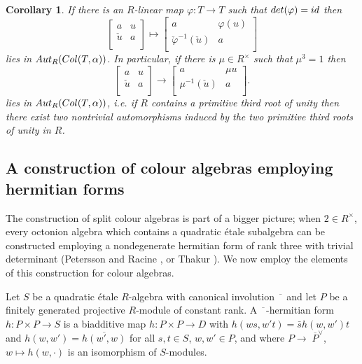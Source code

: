 \documentclass[10pt]{amsart}
\theoremstyle{plain}
\newtheorem{corollary}[theorem]{Corollary}
\theoremstyle{definition}
\newcommand{\can}{\overline{\phantom{x}}}
\begin{document}
\begin{corollary}
If there is an $R$-linear map $\varphi:T\to T$  such that ${\rm det}(\varphi)=id$
 then
\[
\left [\begin {array}{cc}
 a & u\\
\check{u}  &  a \\
\end {array}\right ]\mapsto
\left [\begin {array}{cc}
 a & \varphi(u)\\
\check{\varphi}^{-1}(\check{u})  &  a \\
\end {array}\right ]
\]
lies in ${\rm Aut}_R({\rm Col}( T,\alpha))$.
 In particular, if there is $\mu\in R^\times$ such that $\mu^3=1$ then
\[
\left [\begin {array}{cc}
 a & u\\
\check{u}  &  a \\
\end {array}\right ]\to
\left [\begin {array}{cc}
 a & \mu u\\
\mu^{ -1}(\check{u})  &  a \\
\end {array}\right ] .
\]
lies in ${\rm Aut}_R({\rm Col}( T,\alpha))$,
i.e. if $R$ contains a primitive third root of unity then there exist two nontrivial automorphisms induced by  the two primitive third roots of unity in $R$.
\end{corollary}


\subsection{A construction of colour algebras employing hermitian forms}\label{sec:hermitian}

The construction of split colour algebras is part of a bigger picture; when $2\in R^\times$, every octonion algebra which contains a quadratic  \'etale  subalgebra
can be constructed employing a nondegenerate hermitian form of rank three with trivial determinant (Petersson and Racine \cite[3.8]{PR}, or Thakur \cite{T}). We now employ the elements of this construction for colour algebras.


 Let $S$ be a quadratic  \'etale $R$-algebra with canonical involution $\can$ and let $P$ be a finitely generated projective $R$-module of constant rank. A $\can$-hermitian form $h \colon P \times P \to S$ is a biadditive map
$h \colon P \times P \to D$ with $h(ws, w't) = \bar s h (w, w') t$ and
$h(w, w') = \overline{ h(w', w)}$ for all $s, t \in S$, $w, w' \in P$, and where
$P \to\; \overline{P}^{\vee}$, $w \mapsto h (w,\cdot)$ is an isomorphism of
$S$-modules.
\end{document}
